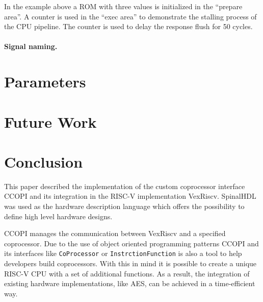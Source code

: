 \documentclass[twoside,twocolumn]{article}
\newcommand{\code}[1]{\texttt{#1}}
\begin{document}
In the example above a ROM with three values is initialized in the
``prepare area''. A counter is used in the ``exec area'' to demonstrate
the stalling process of the CPU pipeline. The counter is used to delay the
response flush for 50 cycles.
\paragraph{Signal naming.} 

\section{Parameters}

\section{Future Work}

\section{Conclusion}
This paper described the implementation of the custom coprocessor
interface CCOPI and its integration in the RISC-V implementation
VexRiscv. SpinalHDL was used as the hardware description language
which offers the possibility to define high level hardware designs.

CCOPI manages the communication between VexRiscv and a specified
coprocessor. Due to the use of object oriented programming patterns
CCOPI and its interfaces like \code{CoProcessor} or
\code{InstrctionFunction} is also a tool to help developers build
coprocessors. With this in mind it is possible to create a unique
RISC-V CPU with a set of additional functions. As a result, the integration of
existing hardware implementations, like AES, can be achieved in a 
time-efficient way. 
\vfill



\end{document}
